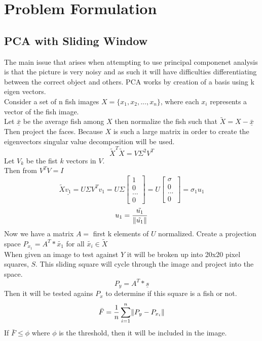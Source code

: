 \documentclass[11pt]{article} %
\renewcommand{\vec}[1]{\underline{#1}}
\DeclarePairedDelimiter{\norm}{\lVert}{\rVert}
\begin{document}
\section{Problem Formulation}
\subsection{PCA with Sliding Window}
The main issue that arises when attempting to use principal componenet analysis is that the picture is very noisy
and as such it will have difficulties differentiating between the correct object and others. PCA works by
creation of a basis using k eigen vectors. \\
Consider a set of n fish images $X=\{x_1,x_2,...,x_n\}$, where each $x_i$ represents a vector of the fish image.\\
Let $\bar{\vec{x}}$ be the average fish among $X$ then normalize the fish such that $\tilde{X} = X- \bar{\vec{x}}$ \\
Then project the faces. Because $X$ is such a large matrix in order to create the eigenvectors singular value decomposition will be used.\\
\[\tilde{X}^{T}\tilde{X} = V \Sigma ^2 V^{T} \]
Let $V_k$ be the fist $k$ vectors in $V$. \\
Then from $V^{T}V=I$
\[ \tilde{X} \vec{v_1} = U \Sigma V^{T} v_{1} = U \Sigma \begin{bmatrix}1 \\0 \\...\\ 0 \end{bmatrix} = U\begin{bmatrix}\sigma \\ 0 \\... \\0\end{bmatrix} = \sigma_1 u_1 \]
\[u_1 = \frac{\tilde{u_1}}{\norm{\tilde{u_1}}} \]
Now we have a matrix $A = $ first k elements of $U$ normalized. Create a projection space $P_{x_1} = A^{T}*\tilde{x_1}$ for all $\tilde{x_i}\in\tilde{X}$
\\
When given an image to test against $Y$ it will be broken up into 20x20 pixel squares, $S$. This sliding square will cycle through the image and project into the space.
\[P_y = A^{T}*\vec{s} \]
Then it will be tested agains $P_x$ to determine if this square is a fish or not.
\[\bar{F} = \frac{1}{n} \sum_{i=1}^n \norm{P_y - P_{x_i}} \]
If $\bar{F}\leq \phi$ where $\phi$ is the threshold, then it will be included in the image.
\end{document}
